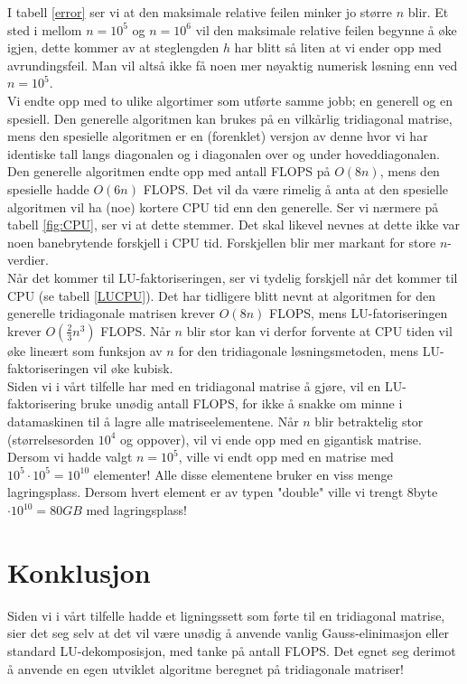 \documentclass{article}
\begin{document}
I tabell \ref{error} ser vi at den maksimale relative feilen minker jo større $n$ blir. Et sted i mellom $n=10^5$ og $n=10^6$ vil den maksimale relative feilen begynne å øke igjen, dette kommer av at steglengden $h$ har blitt så liten at vi ender opp med avrundingsfeil. Man vil altså ikke få noen mer nøyaktig numerisk løsning enn ved $n=10^5$.\\

Vi endte opp med to ulike algortimer som utførte samme jobb; en generell og en spesiell. Den generelle algoritmen kan brukes på en vilkårlig tridiagonal matrise, mens den spesielle algoritmen er en (forenklet) versjon av denne hvor vi har identiske tall langs diagonalen og i diagonalen over og under hoveddiagonalen. Den generelle algoritmen endte opp med antall FLOPS på $O(8n)$, mens den spesielle hadde $O(6n)$ FLOPS. Det vil da være rimelig å anta at den spesielle algoritmen vil ha (noe) kortere CPU tid enn den generelle. Ser vi nærmere på tabell \ref{fig:CPU}, ser vi at dette stemmer. Det skal likevel nevnes at dette ikke var noen banebrytende forskjell i CPU tid. Forskjellen blir mer markant for store $n$-verdier. \\

Når det kommer til LU-faktoriseringen, ser vi tydelig forskjell når det kommer til CPU (se tabell \ref{LUCPU}). Det har tidligere blitt nevnt at algoritmen for den generelle tridiagonale matrisen krever $O(8n)$ FLOPS, mens LU-fatoriseringen krever $O(\frac{2}{3}n^3)$ FLOPS. Når $n$ blir stor kan vi derfor forvente at CPU tiden vil øke lineært som funksjon av $n$ for den tridiagonale løsningsmetoden, mens LU-faktoriseringen vil øke kubisk.\\

Siden vi i vårt tilfelle har med en tridiagonal matrise å gjøre, vil en LU-faktorisering bruke unødig antall FLOPS, for ikke å snakke om minne i datamaskinen til å lagre alle matriseelementene. Når $n$ blir betraktelig stor (størrelsesorden $10^4$ og oppover), vil vi ende opp med en gigantisk matrise. Dersom vi hadde valgt $n=10^5$, ville vi endt opp med en matrise med $10^5\cdot 10^5 = 10^{10}$ elementer! Alle disse elementene bruker en viss menge lagringsplass. Dersom hvert element er av typen "double" ville vi trengt 8byte$\cdot10^{10} = 80GB$ med lagringsplass!


\section{Konklusjon}
Siden vi i vårt tilfelle hadde et ligningssett som førte til en tridiagonal matrise, sier det seg selv at det vil være unødig å anvende vanlig Gauss-elinimasjon eller standard LU-dekomposisjon, med tanke på antall FLOPS. Det egnet seg derimot å anvende en egen utviklet algoritme beregnet på tridiagonale matriser!\\
\end{document}
